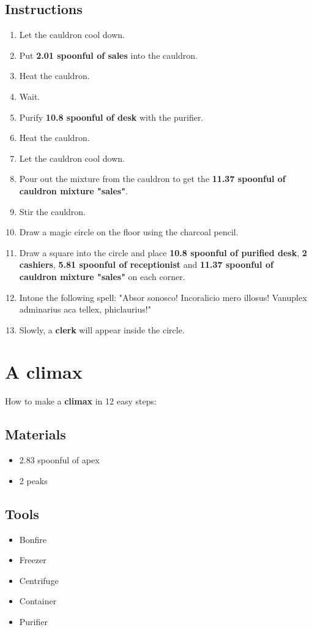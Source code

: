 \documentclass{article}
\begin{document}
\subsection{Instructions}\begin{enumerate}
\item 
Let the cauldron cool down.
\item 
Put \textbf{2.01 spoonful of sales} into the cauldron.
\item 
Heat the cauldron.
\item 
Wait.
\item 
Purify \textbf{10.8 spoonful of desk} with the purifier.
\item 
Heat the cauldron.
\item 
Let the cauldron cool down.
\item 
Pour out the mixture from the cauldron to get the \textbf{11.37 spoonful of cauldron mixture "sales"}.
\item 
Stir the cauldron.
\item 
Draw a magic circle on the floor using the charcoal pencil.
\item 
Draw a square into the circle and place \textbf{10.8 spoonful of purified desk}, \textbf{2 cashiers}, \textbf{5.81 spoonful of receptionist} and \textbf{11.37 spoonful of cauldron mixture "sales"} on each corner.
\item 
Intone the following spell: "Absor sonosco! Incoralicio mero illosus! Vanuplex adminarius aca tellex, phiclaurius!"
\item 
Slowly, a \textbf{clerk} will appear inside the circle.
\end{enumerate}
\newpage
\section{A climax}How to make a \textbf{climax} in 12 easy steps:

\subsection{Materials}\begin{itemize}
\item 
2.83 spoonful of apex
\item 
2 peaks
\end{itemize}
\subsection{Tools}\begin{itemize}
\item 
Bonfire
\item 
Freezer
\item 
Centrifuge
\item 
Container
\item 
Purifier
\end{itemize}
\end{document}
